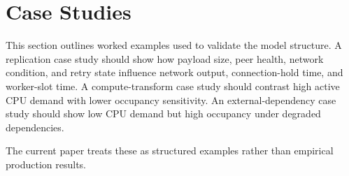 \section{Case Studies}
\label{sec:case-studies}

This section outlines worked examples used to validate the model structure. A
replication case study should show how payload size, peer health, network
condition, and retry state influence network output, connection-hold time, and
worker-slot time. A compute-transform case study should contrast high active
CPU demand with lower occupancy sensitivity. An external-dependency case study
should show low CPU demand but high occupancy under degraded dependencies.

The current paper treats these as structured examples rather than empirical
production results.
